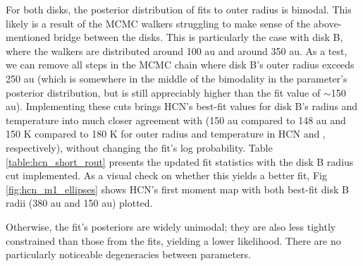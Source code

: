 For both disks, the posterior distribution of fits to outer radius is bimodal. This likely is a result of the MCMC walkers struggling to make sense of the above-mentioned bridge between the disks. This is particularly the case with disk B, where the walkers are distributed around 100 au and around 350 au. As a test, we can remove all steps in the MCMC chain where disk B's outer radius exceeds 250 au (which is somewhere in the middle of the bimodality in the parameter's posterior distribution, but is still appreciably higher than the \hco fit value of $\sim$150 au). Implementing these cuts brings HCN's best-fit values for disk B's radius and temperature into much closer agreement with \hco (150 au compared to 148 au and 150 K compared to 180 K for outer radius and temperature in HCN and \hco, respectively), without changing the fit's log probability. Table \ref{table:hcn_short_rout} presents the updated fit statistics with the disk B radius cut implemented. As a visual check on whether this yields a better fit, Fig \ref{fig:hcn_m1_ellipses} shows HCN's first moment map with both best-fit disk B radii (380 au and 150 au) plotted.

Otherwise, the fit's posteriors are widely unimodal; they are also less tightly constrained than those from the \hco fits, yielding a lower likelihood. There are no particularly noticeable degeneracies between parameters.



